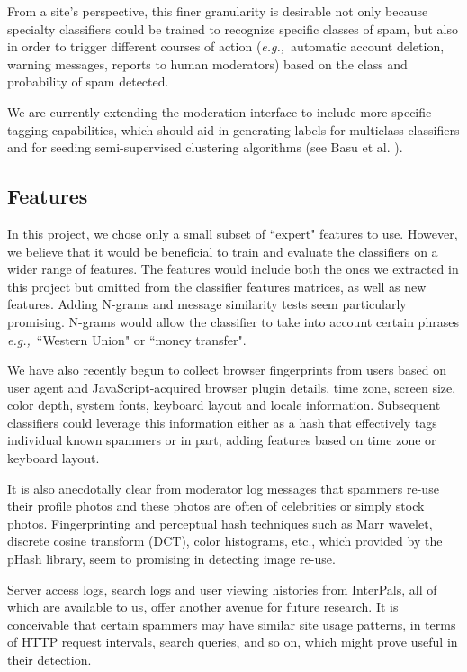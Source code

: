 \documentclass[preprint]{acm_proc_article-sp}
\newcommand{\eg}{{\em e.g.,}~}
\begin{document}
From a site's perspective, this finer granularity is desirable not only 
because specialty classifiers could be trained to recognize specific classes of spam, but also in order to 
trigger different courses of action (\eg automatic account deletion, warning messages, reports to human moderators) 
based on the class and probability of spam detected.

We are currently extending the moderation interface to include more specific tagging capabilities, which should aid 
in generating labels for multiclass classifiers and for seeding semi-supervised clustering algorithms (see Basu et al. 
\cite{basu}).

\subsection{Features}

In this project, we chose only a small subset of ``expert" features to use. However, we believe that 
it would be beneficial to train and evaluate the classifiers on a wider range of features. The features 
would include both the ones we extracted in this project but omitted from the classifier features matrices, 
as well as new features. Adding N-grams and message similarity tests seem particularly promising. 
N-grams would allow the classifier to take into account certain phrases \eg{``Western Union" or ``money transfer"}. 

We have also recently begun to collect browser fingerprints from users based on user agent 
and JavaScript-acquired browser plugin details, time zone, screen size, color depth, system fonts, 
keyboard layout and locale information. Subsequent classifiers could leverage this information either 
as a hash that effectively tags individual known spammers or in part, adding features based on 
time zone or keyboard layout.

It is also anecdotally clear from moderator log messages that spammers re-use their profile photos and 
these photos are often of celebrities or simply stock photos. Fingerprinting and perceptual hash techniques 
such as Marr wavelet, discrete cosine transform (DCT), color histograms, etc., which provided by the 
pHash library\cite{phash}, seem to promising in detecting image re-use. 

Server access logs, search logs and user viewing histories from InterPals, all of which 
are available to us, offer another avenue for future research. It is conceivable that certain 
spammers may have similar site usage patterns, in terms of HTTP request intervals, search queries, 
and so on, which might prove useful in their detection.
\end{document}
